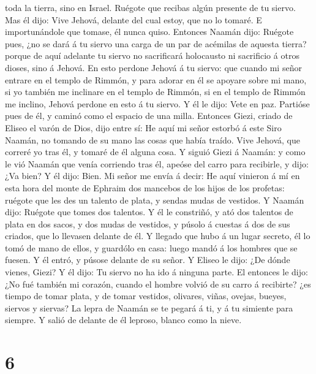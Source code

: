 toda la tierra, sino en Israel. Ruégote que recibas algún presente de tu
siervo.  Mas él dijo: Vive Jehová, delante del cual
estoy, que no lo tomaré. E importunándole que tomase, él nunca quiso.
 Entonces Naamán dijo: Ruégote pues, ¿no se dará á tu
siervo una carga de un par de acémilas de aquesta tierra? porque de aquí
adelante tu siervo no sacrificará holocausto ni sacrificio á otros
dioses, sino á Jehová.  En esto perdone Jehová á tu
siervo: que cuando mi señor entrare en el templo de Rimmón, y para
adorar en él se apoyare sobre mi mano, si yo también me inclinare en el
templo de Rimmón, si en el templo de Rimmón me inclino, Jehová perdone
en esto á tu siervo.  Y él le dijo: Vete en paz. Partióse
pues de él, y caminó como el espacio de una milla. 
Entonces Giezi, criado de Eliseo el varón de Dios, dijo entre sí: He
aquí mi señor estorbó á este Siro Naamán, no tomando de su mano las
cosas que había traído. Vive Jehová, que correré yo tras él, y tomaré de
él alguna cosa.  Y siguió Giezi á Naamán: y como le vió
Naamán que venía corriendo tras él, apeóse del carro para recibirle, y
dijo: ¿Va bien?  Y él dijo: Bien. Mi señor me envía á
decir: He aquí vinieron á mí en esta hora del monte de Ephraim dos
mancebos de los hijos de los profetas: ruégote que les des un talento de
plata, y sendas mudas de vestidos.  Y Naamán dijo:
Ruégote que tomes dos talentos. Y él le constriñó, y ató dos talentos de
plata en dos sacos, y dos mudas de vestidos, y púsolo á cuestas á dos de
sus criados, que lo llevasen delante de él.  Y llegado
que hubo á un lugar secreto, él lo tomó de mano de ellos, y guardólo en
casa: luego mandó á los hombres que se fuesen.  Y él
entró, y púsose delante de su señor. Y Eliseo le dijo: ¿De dónde vienes,
Giezi? Y él dijo: Tu siervo no ha ido á ninguna parte. 
El entonces le dijo: ¿No fué también mi corazón, cuando el hombre volvió
de su carro á recibirte? ¿es tiempo de tomar plata, y de tomar vestidos,
olivares, viñas, ovejas, bueyes, siervos y siervas?  La
lepra de Naamán se te pegará á ti, y á tu simiente para siempre. Y salió
de delante de él leproso, blanco como la nieve.

\hypertarget{section-5}{%
\section{6}\label{section-5}}

